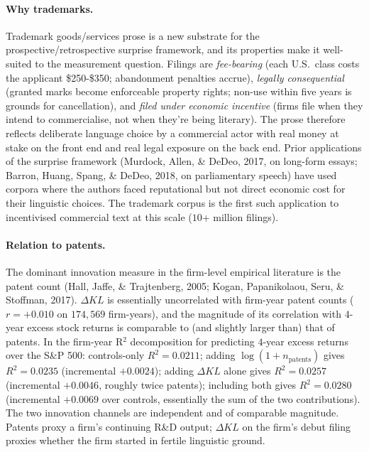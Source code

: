 \documentclass[11pt]{article}
\begin{document}
\paragraph{Why trademarks.} Trademark goods/services prose is a new
substrate for the prospective/retrospective surprise framework, and
its properties make it well-suited to the measurement question.
Filings are \emph{fee-bearing} (each U.S.\ class costs the applicant
\$250-\$350; abandonment penalties accrue), \emph{legally
consequential} (granted marks become enforceable property rights;
non-use within five years is grounds for cancellation), and
\emph{filed under economic incentive} (firms file when they intend
to commercialise, not when they're being literary). The prose
therefore reflects deliberate language choice by a commercial actor
with real money at stake on the front end and real legal exposure on
the back end. Prior applications of the surprise framework (Murdock,
Allen, \& DeDeo, 2017, on long-form essays; Barron, Huang, Spang, \&
DeDeo, 2018, on parliamentary speech) have used corpora where the
authors faced reputational but not direct economic cost for their
linguistic choices. The trademark corpus is the first such
application to incentivised commercial text at this scale
($10$+ million filings).

\paragraph{Relation to patents.} The dominant innovation measure in
the firm-level empirical literature is the patent count (Hall, Jaffe,
\& Trajtenberg, 2005; Kogan, Papanikolaou, Seru, \& Stoffman, 2017).
$\Delta KL$ is essentially uncorrelated with firm-year patent counts
($r = +0.010$ on $174{,}569$ firm-years), and the magnitude of its
correlation with $4$-year excess stock returns is comparable to (and
slightly larger than) that of patents. In the firm-year R$^2$
decomposition for predicting $4$-year excess returns over the S\&P
500: controls-only $R^2 = 0.0211$; adding $\log(1 + n_\text{patents})$
gives $R^2 = 0.0235$ (incremental $+0.0024$); adding $\Delta KL$
alone gives $R^2 = 0.0257$ (incremental $+0.0046$, roughly twice
patents); including both gives $R^2 = 0.0280$ (incremental $+0.0069$
over controls, essentially the sum of the two contributions). The
two innovation channels are independent and of comparable magnitude.
Patents proxy a firm's continuing R\&D output; $\Delta KL$ on the
firm's debut filing proxies whether the firm started in fertile
linguistic ground.
\end{document}
